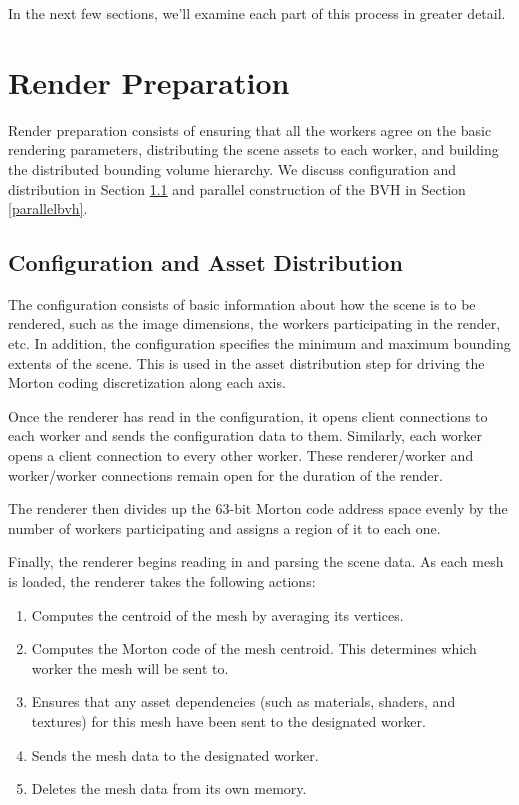 \documentclass[12pt]{ucthesis}
\begin{document}
In the next few sections, we'll examine each part of this process in greater
detail.

\section{Render Preparation}
\label{prep}

Render preparation consists of ensuring that all the workers agree on the
basic rendering parameters, distributing the scene assets to each worker, and
building the distributed bounding volume hierarchy. We discuss configuration
and distribution in Section \ref{sync} and parallel construction of the BVH in
Section \ref{parallelbvh}.

\subsection{Configuration and Asset Distribution}
\label{sync}

The configuration consists of basic information about how the scene is to be
rendered, such as the image dimensions, the workers participating in the render,
etc. In addition, the configuration specifies the minimum and maximum bounding
extents of the scene. This is used in the asset distribution step for driving
the Morton coding discretization along each axis.

Once the renderer has read in the configuration, it opens client connections
to each worker and sends the configuration data to them. Similarly, each worker
opens a client connection to every other worker. These renderer/worker and
worker/worker connections remain open for the duration of the render.

The renderer then divides up the 63-bit Morton code address space evenly by the
number of workers participating and assigns a region of it to each one.

Finally, the renderer begins reading in and parsing the scene data. As each mesh
is loaded, the renderer takes the following actions:

\begin{enumerate}
   \item Computes the centroid of the mesh by averaging its vertices.
   \item Computes the Morton code of the mesh centroid. This determines
      which worker the mesh will be sent to.
   \item Ensures that any asset dependencies (such as materials,
      shaders, and textures) for this mesh have been sent to the designated worker.
   \item Sends the mesh data to the designated worker.
   \item Deletes the mesh data from its own memory.
\end{enumerate}
\end{document}

